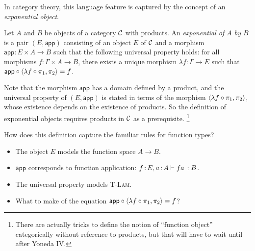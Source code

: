 In category theory, this language feature is captured by
the concept of an \emph{exponential object}.
\newcommand\app{\mathsf{app}}
\newcommand\lam{\lambda}
\begin{definition} \label{def:exponential}
  \sloppy
  Let \(A\) and \(B\) be objects of a category \(\mathcal C\) with products.
  An \emph{exponential of \(A\) by \(B\)}
  is a pair \((E,\app)\) consisting of
  an object \(E\) of \(\mathcal C\)
  and a morphism
  \(\app : E\times A \to B\)
  such that the following universal property holds:
  for all morphisms \(f : \Gamma \times A \to B\),
  there exists a unique morphism \(\lam f : \Gamma \to E\)
  such that \(\app \circ \angled{\lam f \circ \pi_1, \pi_2} = f\).
\end{definition}

Note that the morphism \(\app\)
has a domain defined by a product,
and the universal property of \((E,\app)\)
is stated in terms of the morphism \(\angled{\lam f \circ \pi_1,\pi_2}\),
whose existence depends on the existence of products.
So the definition of exponential objects
requires products in \(\mathcal C\) as a prerequisite.%
\footnote{There are actually tricks to define
the notion of ``function object'' categorically
without reference to products, but that will have to wait until after Yoneda IV.}

\noindent How does this definition capture the familiar rules for function types?
\begin{itemize}
  \item The object \(E\) models the function space \(A \to B\).
  \item \(\app\) corresponds to function application:
    \(f\,{:}\, E, a\,{:}\, A \vdash fa\,: B\).
  \item The universal property models \textsc{T-Lam}.
  \item What to make of the equation \(\app \circ \angled{\lam f \circ \pi_1, \pi_2} = f\)?
\end{itemize}

